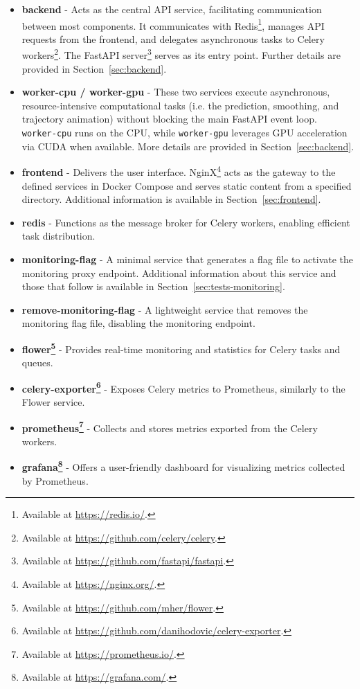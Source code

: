 \begin{itemize}
    \item \textbf{backend} - Acts as the central API service, facilitating communication between most components. It communicates with Redis\footnote{Available at \url{https://redis.io/}.}, manages API requests from the frontend, and delegates asynchronous tasks to Celery workers\footnote{Available at \url{https://github.com/celery/celery}.}. The FastAPI server\footnote{Available at \url{https://github.com/fastapi/fastapi}.} serves as its entry point. Further details are provided in Section~\ref{sec:backend}.
    \item \textbf{worker-cpu / worker-gpu} - These two services execute asynchronous, resource-intensive computational tasks (i.e. the prediction, smoothing, and trajectory animation) without blocking the main FastAPI event loop. \lstinline|worker-cpu| runs on the CPU, while \lstinline|worker-gpu| leverages GPU acceleration via CUDA when available. More details are provided in Section~\ref{sec:backend}.
    \item \textbf{frontend} - Delivers the user interface. NginX\footnote{Available at \url{https://nginx.org/}.} acts as the gateway to the defined services in Docker Compose and serves static content from a specified directory. Additional information is available in Section~\ref{sec:frontend}.
    \item \textbf{redis} - Functions as the message broker for Celery workers, enabling efficient task distribution.
    \item \textbf{monitoring-flag} - A minimal service that generates a flag file to activate the monitoring proxy endpoint. Additional information about this service and those that follow is available in Section~\ref{sec:tests-monitoring}.
    \item \textbf{remove-monitoring-flag} - A lightweight service that removes the monitoring flag file, disabling the monitoring endpoint.
    \item \textbf{flower\footnote{Available at \url{https://github.com/mher/flower}.}} - Provides real-time monitoring and statistics for Celery tasks and queues.
    \item \textbf{celery-exporter\footnote{Available at \url{https://github.com/danihodovic/celery-exporter}.}} - Exposes Celery metrics to Prometheus, similarly to the Flower service.
    \item \textbf{prometheus\footnote{Available at \url{https://prometheus.io/}.}} - Collects and stores metrics exported from the Celery workers.
    \item \textbf{grafana\footnote{Available at \url{https://grafana.com/}.}} - Offers a user-friendly dashboard for visualizing metrics collected by Prometheus.
\end{itemize}


